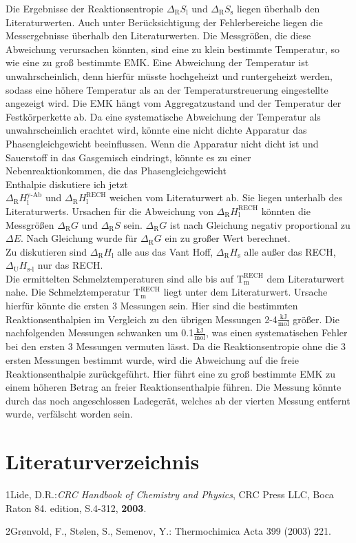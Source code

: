 \documentclass[12pt,a4paper,titlepage,headinclude,bibtotoc]{scrartcl}
\begin{document}
Die Ergebnisse der Reaktionsentropie $\Delta_\text{R} S_{\text{l}}$ und $\Delta_\text{R} S_{\text{s}}$ liegen überhalb den Literaturwerten. Auch unter Berücksichtigung der Fehlerbereiche liegen die Messergebnisse überhalb den Literaturwerten. Die Messgrößen, die diese Abweichung verursachen könnten, sind eine zu klein bestimmte Temperatur, so wie eine zu groß bestimmte EMK. Eine Abweichung der Temperatur ist unwahrscheinlich, denn hierfür müsste hochgeheizt und runtergeheizt werden, sodass eine höhere Temperatur als an der Temperaturstreuerung eingestellte angezeigt wird. Die EMK hängt vom Aggregatzustand und der Temperatur der Festkörperkette ab. Da eine systematische Abweichung der Temperatur als unwahrscheinlich erachtet wird, könnte eine nicht dichte Apparatur das Phasengleichgewicht beeinflussen. Wenn die Apparatur nicht dicht ist und Sauerstoff in das Gasgemisch eindringt, könnte es zu einer Nebenreaktionkommen, die das Phasengleichgewicht \\

Enthalpie diskutiere ich jetzt \\
$\Delta_\text{R} H_{\text{l}}^{\text{y-Ab}}$ und $\Delta_\text{R} H_{\text{l}}^{\text{RECH}}$ weichen vom Literaturwert ab. Sie liegen unterhalb des Literaturwerts. Ursachen für die Abweichung von $\Delta_\text{R} H_{\text{l}}^{\text{RECH}}$ könnten die Messgrößen $\Delta_\text{R} G$ und  $\Delta_\text{R} S$ sein. $\Delta_\text{R} G$ ist nach Gleichung negativ proportional zu $\Delta E$. Nach Gleichung wurde für $\Delta_\text{R} G$ ein zu großer Wert berechnet. \\


Zu diskutieren sind $\Delta_\text{R} H_{\text{l}}$ alle aus das Vant Hoff, $\Delta_\text{R} H_{\text{s}}$ alle außer das RECH, $\Delta_\text{U} H_{\text{s-l}}$ nur das RECH.\\
Die ermittelten Schmelztemperaturen sind alle bis auf $\text{T}_{\text{m}}^{\text{RECH}}$ dem Literaturwert nahe. Die Schmelztemperatur $\text{T}_{\text{m}}^{\text{RECH}}$ liegt unter dem Literaturwert. Ursache hierfür könnte die ersten 3 Messungen sein. Hier sind die bestimmten Reaktionsenthalpien im Vergleich zu den übrigen Messungen 2-4\;$\frac{\text{kJ}}{\text{mol}}$ größer. Die nachfolgenden Messungen schwanken um 0.1\;$\frac{\text{kJ}}{\text{mol}}$, was einen systematischen Fehler bei den ersten 3 Messungen vermuten lässt. Da die Reaktionsentropie ohne die 3 ersten Messungen bestimmt wurde, wird die Abweichung auf die freie Reaktionsenthalpie zurückgeführt. Hier führt eine zu groß bestimmte EMK zu einem höheren Betrag an freier Reaktionsenthalpie führen. Die Messung könnte durch das noch angeschlossen Ladegerät, welches ab der vierten Messung entfernt wurde, verfälscht worden sein.
\newpage
\section{Literaturverzeichnis}
1\quad Lide, D.R.:\textit{CRC Handbook of Chemistry and Physics}, CRC Press LLC, Boca Raton 84. edition, S.4-312, \textbf{2003}.

\vspace{0,5 cm}
2\quad Grønvold, F., Stølen, S., Semenov, Y.: Thermochimica Acta 399 (2003) 221.
\end{document}
